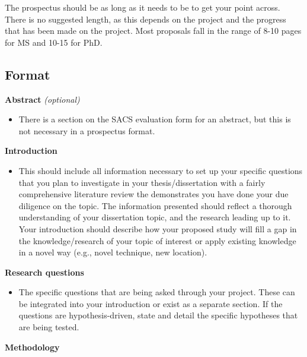 \documentclass[
]{article}
\providecommand{\tightlist}{%
  \setlength{\itemsep}{0pt}\setlength{\parskip}{0pt}}
\begin{document}
The prospectus should be as long as it needs to be to get your point across. There is no suggested length, as this depends on the project and the progress that has been made on the project. Most proposals fall in the range of 8-10 pages for MS and 10-15 for PhD.

\hypertarget{format}{%
\subsection{Format}\label{format}}

\textbf{Abstract} \emph{(optional)}

\begin{itemize}
\tightlist
\item
  There is a section on the SACS evaluation form for an abstract, but this is not necessary in a prospectus format.
\end{itemize}

\textbf{Introduction}

\begin{itemize}
\tightlist
\item
  This should include all information necessary to set up your specific questions that you plan to investigate in your thesis/dissertation with a fairly comprehensive literature review the demonstrates you have done your due diligence on the topic. The information presented should reflect a thorough understanding of your dissertation topic, and the research leading up to it. Your introduction should describe how your proposed study will fill a gap in the knowledge/research of your topic of interest or apply existing knowledge in a novel way (e.g., novel technique, new location).
\end{itemize}

\textbf{Research questions}

\begin{itemize}
\tightlist
\item
  The specific questions that are being asked through your project. These can be integrated into your introduction or exist as a separate section. If the questions are hypothesis-driven, state and detail the specific hypotheses that are being tested.
\end{itemize}

\textbf{Methodology}
\end{document}
